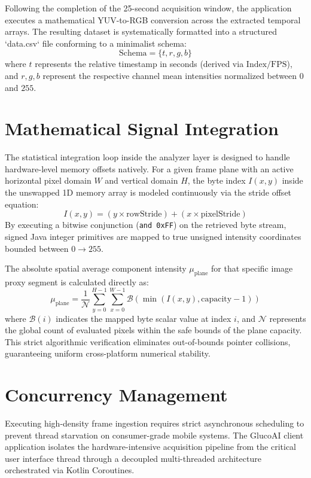 Following the completion of the 25-second acquisition window, the application executes a mathematical YUV-to-RGB conversion across the extracted temporal arrays. The resulting dataset is systematically formatted into a structured `data.csv` file conforming to a minimalist schema:
\begin{equation}
\text{Schema} = \{t, r, g, b\}
\end{equation}
where $t$ represents the relative timestamp in seconds (derived via $\text{Index} / \text{FPS}$), and $r, g, b$ represent the respective channel mean intensities normalized between $0$ and $255$.

\section{Mathematical Signal Integration}
The statistical integration loop inside the analyzer layer is designed to handle hardware-level memory offsets natively. For a given frame plane with an active horizontal pixel domain $W$ and vertical domain $H$, the byte index $I(x, y)$ inside the unswapped 1D memory array is modeled continuously via the stride offset equation:
\begin{equation}
I(x, y) = (y \times \text{rowStride}) + (x \times \text{pixelStride})
\end{equation}
By executing a bitwise conjunction (\texttt{and 0xFF}) on the retrieved byte stream, signed Java integer primitives are mapped to true unsigned intensity coordinates bounded between $0 \to 255$.

The absolute spatial average component intensity $\mu_{\text{plane}}$ for that specific image proxy segment is calculated directly as:
\begin{equation}
\mu_{\text{plane}} = \frac{1}{\mathcal{N}} \sum_{y=0}^{H-1} \sum_{x=0}^{W-1} \mathcal{B}\left(\min\left(I(x, y), \text{capacity} - 1\right)\right)
\end{equation}
where $\mathcal{B}(i)$ indicates the mapped byte scalar value at index $i$, and $\mathcal{N}$ represents the global count of evaluated pixels within the safe bounds of the plane capacity. This strict algorithmic verification eliminates out-of-bounds pointer collisions, guaranteeing uniform cross-platform numerical stability.

\section{Concurrency Management}
Executing high-density frame ingestion requires strict asynchronous scheduling to prevent thread starvation on consumer-grade mobile systems. The GlucoAI client application isolates the hardware-intensive acquisition pipeline from the critical user interface thread through a decoupled multi-threaded architecture orchestrated via Kotlin Coroutines.

